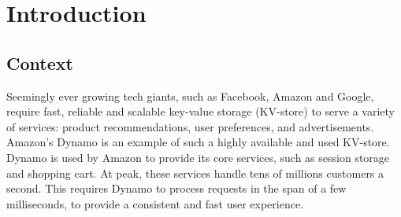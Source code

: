 

\chapter{Introduction}








\section{Context}
Seemingly ever growing tech giants, such as Facebook, Amazon and Google, require fast, reliable and scalable key-value storage (KV-store) to serve a variety of services: product recommendations, user preferences, and advertisements\cite{decandia2007dynamo,geambasu2010comet}.
Amazon's Dynamo is an example of such a highly available and used KV-store.
Dynamo is used by Amazon to provide its core services, such as session storage and shopping cart\cite{decandia2007dynamo}.
At peak, these services handle tens of millions customers a second.
This requires Dynamo to process requests in the span of a few milliseconds, to provide a consistent and fast user experience.

